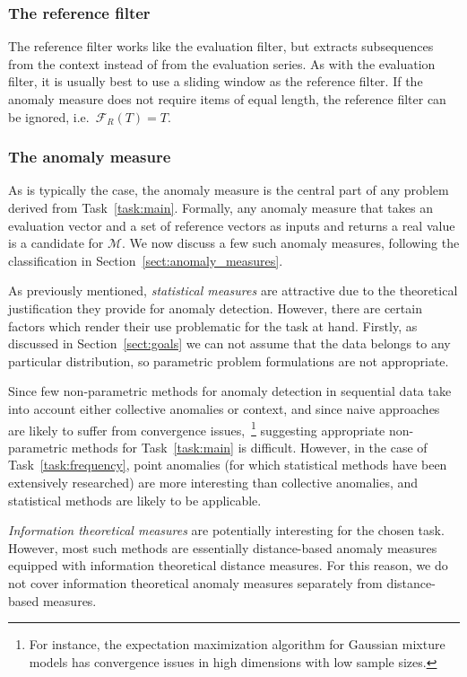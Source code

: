 \subsubsection{The reference filter}

The reference filter works like the evaluation filter, but extracts subsequences from the context instead of from the evaluation series. As with the evaluation filter, it is usually best to use a sliding window as the reference filter. If the anomaly measure does not require items of equal length, the reference filter can be ignored, i.e.\  $\mathcal{F}_R(T) = T$.

\subsubsection{The anomaly measure}

As is typically the case, the anomaly measure is the central part of any problem derived from Task~\ref{task:main}. Formally, any anomaly measure that takes an evaluation vector and a set of reference vectors as inputs and returns a real value is a candidate for $\mathcal{M}$. We now discuss a few such anomaly measures, following the classification in Section~\ref{sect:anomaly_measures}.

As previously mentioned, \emph{statistical measures} are attractive due to the theoretical justification they provide for anomaly detection. However, there are certain factors which render their use problematic for the task at hand. Firstly, as discussed in Section~\ref{sect:goals} we can not assume that the data belongs to any particular distribution, so parametric problem formulations are not appropriate.

Since few non-parametric methods for anomaly detection in sequential data take into account either collective anomalies or context, and since naive approaches are likely to suffer from convergence issues,~\footnote{For instance, the expectation maximization algorithm for Gaussian mixture models has convergence issues in high dimensions with low sample sizes.} suggesting appropriate non-parametric methods for Task~\ref{task:main} is difficult. However, in the case of Task~\ref{task:frequency}, point anomalies (for which statistical methods have been extensively researched) are more interesting than collective anomalies, and statistical methods are likely to be applicable.

\emph{Information theoretical measures} are potentially interesting for the chosen task. However, most such methods are essentially distance-based anomaly measures equipped with information theoretical distance measures. For this reason, we do not cover information theoretical anomaly measures separately from distance-based measures.

